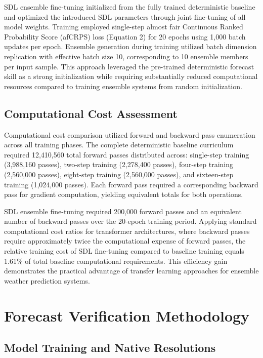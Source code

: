 \documentclass{agujournal2019}
\begin{document}
SDL ensemble fine-tuning initialized from the fully trained deterministic baseline and optimized the introduced SDL parameters through joint fine-tuning of all model weights. Training employed single-step almost fair Continuous Ranked Probability Score (afCRPS) loss (Equation 2) for 20 epochs using 1,000 batch updates per epoch. Ensemble generation during training utilized batch dimension replication with effective batch size 10, corresponding to 10 ensemble members per input sample. This approach leveraged the pre-trained deterministic forecast skill as a strong initialization while requiring substantially reduced computational resources compared to training ensemble systems from random initialization.

\subsection{Computational Cost Assessment}

Computational cost comparison utilized forward and backward pass enumeration across all training phases. The complete deterministic baseline curriculum required 12,410,560 total forward passes distributed across: single-step training (3,988,160 passes), two-step training (2,278,400 passes), four-step training (2,560,000 passes), eight-step training (2,560,000 passes), and sixteen-step training (1,024,000 passes). Each forward pass required a corresponding backward pass for gradient computation, yielding equivalent totals for both operations.

SDL ensemble fine-tuning required 200,000 forward passes and an equivalent number of backward passes over the 20-epoch training period. Applying standard computational cost ratios for transformer architectures, where backward passes require approximately twice the computational expense of forward passes, the relative training cost of SDL fine-tuning compared to baseline training equals 1.61\% of total baseline computational requirements. This efficiency gain demonstrates the practical advantage of transfer learning approaches for ensemble weather prediction systems.

\section{Forecast Verification Methodology}
\label{sec:skill_details}

\subsection{Model Training and Native Resolutions}
\end{document}
